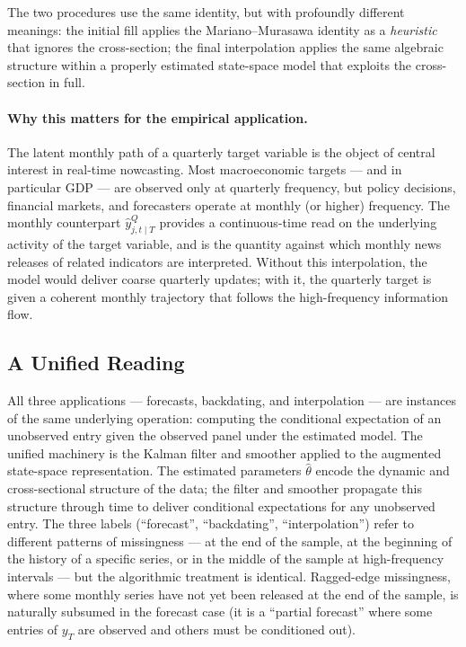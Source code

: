 \documentclass[11pt, a4paper, oneside]{article}
\begin{document}
The two procedures use the same identity, but with profoundly
different meanings: the initial fill applies the Mariano--Murasawa
identity as a \emph{heuristic} that ignores the cross-section; the
final interpolation applies the same algebraic structure within a
properly estimated state-space model that exploits the
cross-section in full.

\paragraph{Why this matters for the empirical application.}
The latent monthly path of a quarterly target variable is the
object of central interest in real-time nowcasting. Most
macroeconomic targets — and in particular GDP — are observed only
at quarterly frequency, but policy decisions, financial markets,
and forecasters operate at monthly (or higher) frequency. The
monthly counterpart $\hat{y}^Q_{j, t \mid T}$ provides a
continuous-time read on the underlying activity of the target
variable, and is the quantity against which monthly news releases
of related indicators are interpreted. Without this interpolation,
the model would deliver coarse quarterly updates; with it, the
quarterly target is given a coherent monthly trajectory that
follows the high-frequency information flow.

\subsection{A Unified Reading}

All three applications — forecasts, backdating, and interpolation —
are instances of the same underlying operation: computing the
conditional expectation of an unobserved entry given the observed
panel under the estimated model.
The unified machinery is the Kalman filter and smoother applied to
the augmented state-space representation. The estimated parameters
$\hat{\theta}$ encode the dynamic and cross-sectional structure of
the data; the filter and smoother propagate this structure through
time to deliver conditional expectations for any unobserved entry.
The three labels (``forecast'', ``backdating'', ``interpolation'')
refer to different patterns of missingness — at the end of the
sample, at the beginning of the history of a specific series, or
in the middle of the sample at high-frequency intervals — but the
algorithmic treatment is identical. Ragged-edge missingness, where
some monthly series have not yet been released at the end of the
sample, is naturally subsumed in the forecast case (it is a
``partial forecast'' where some entries of $y_{T}$ are observed and
others must be conditioned out). 
\end{document}
